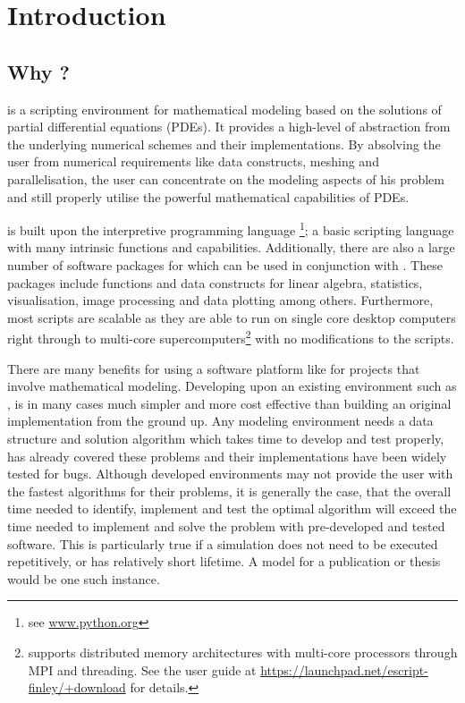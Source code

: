 
%
%
%

\chapter{Introduction}
\label{CHAP INTRO}
\section{Why \esc?}
\esc is a scripting environment for mathematical modeling based on the solutions of partial differential equations (PDEs). It provides a high-level of abstraction from the underlying numerical schemes and their implementations. By absolving the user from numerical requirements like data constructs, meshing and parallelisation, the user can concentrate on the modeling aspects of his problem and still properly utilise the powerful mathematical capabilities of PDEs. 

\esc is built upon the interpretive programming language \pyt\footnote{see \url{www.python.org}}; a basic scripting language with many intrinsic functions and capabilities. Additionally, there are also a large number of software packages for \pyt which can be used in conjunction with \esc. These packages include functions and data constructs for linear algebra, statistics, visualisation, image processing and data plotting among others. Furthermore, most \esc scripts are scalable as they are able to run on single core desktop computers right through to multi-core supercomputers\footnote{\esc supports distributed memory architectures with multi-core processors through MPI and threading. See the \esc user guide at \url{https://launchpad.net/escript-finley/+download} for details.} with no modifications to the scripts. 

There are many benefits for using a software platform like \esc for projects that involve mathematical modeling. Developing upon an existing environment such as \esc, is in many cases much simpler and more cost effective than building an original implementation from the ground up. Any modeling environment needs a data structure and solution algorithm which takes time to develop and test properly, \esc has already covered these problems and their implementations have been widely tested for bugs. Although developed environments may not provide the user with the fastest algorithms for their problems, it is generally the case, that the overall time needed to identify, implement and test the optimal algorithm will exceed the time needed to implement and solve the problem with pre-developed and tested software. This is particularly true if a simulation does not need to be executed repetitively, or has relatively short lifetime. A model for a publication or thesis would be one such instance. 

